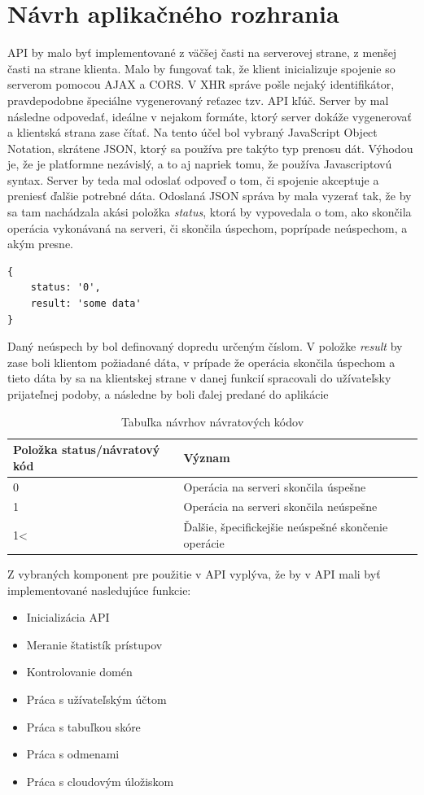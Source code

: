 \section{Návrh aplikačného rozhrania}
API by malo byť implementované z väčšej časti na serverovej strane, z menšej časti na strane klienta. Malo by fungovať tak, že klient inicializuje spojenie so serverom pomocou AJAX a CORS. V XHR správe pošle nejaký identifikátor, pravdepodobne špeciálne vygenerovaný reťazec tzv. API kľúč. Server by mal následne odpovedať, ideálne v nejakom formáte, ktorý server dokáže vygenerovať a klientská strana zase čítať. Na tento účel bol vybraný JavaScript Object Notation, skrátene JSON, ktorý sa používa pre takýto typ prenosu dát. Výhodou je, že je platformne nezávislý, a to aj napriek tomu, že používa Javascriptovú syntax. Server by teda mal odoslať odpoveď o tom, či spojenie akceptuje a preniesť ďalšie potrebné dáta. Odoslaná JSON správa by mala vyzerať tak, že by sa tam nachádzala akási položka \textit{status}, ktorá by vypovedala o tom, ako skončila operácia vykonávaná na serveri, či skončila úspechom, poprípade neúspechom, a akým presne. 
\begin{lstlisting}[]
{
    status: '0',
    result: 'some data'
}
\end{lstlisting}
Daný neúspech by bol definovaný dopredu určeným číslom. V položke \textit{result} by zase boli klientom požiadané dáta, v prípade že operácia skončila úspechom a tieto dáta by sa na klientskej strane v danej funkcií spracovali do užívateľsky prijateľnej podoby, a následne by boli ďalej predané do aplikácie
\begin{table}[h]
\centering
\begin{tabular}{|l|l|l|}
\hline
Položka status/návratový kód & Význam \\ \hline
0 & Operácia na serveri skončila úspešne \\ \hline
1 & Operácia na serveri skončila neúspešne \\ \hline
1\textless & Ďalšie, špecifickejšie neúspešné skončenie operácie \\ \hline
\end{tabular}
\label{navratovekody}
\caption{Tabuľka návrhov návratových kódov}
\end{table}

Z vybraných komponent pre použitie v API vyplýva, že by v API mali byť implementované nasledujúce funkcie:
\begin{itemize}
\item Inicializácia API
\item Meranie štatistík prístupov
\item Kontrolovanie domén
\item Práca s užívateľským účtom
\item Práca s tabuľkou skóre
\item Práca s odmenami
\item Práca s cloudovým úložiskom
\end{itemize}

